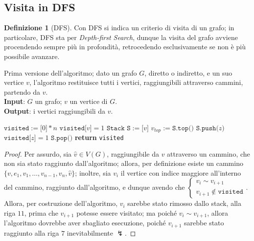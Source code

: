 \documentclass[14pt]{extreport}
\theoremstyle{definition}
\newtheorem{definition}{Definizione}[subsection]
\theoremstyle{definition}
\begin{document}
\subsection{Visita in DFS}

\begin{definition}[DFS]
    Con DFS si indica un criterio di visita di un grafo; in particolare, DFS sta per \textit{Depth-first Search}, dunque la visita del grafo avviene procendendo sempre più in profondità, retrocedendo esclusivamente se non è più possibile avanzare.
\end{definition}

\begin{algorithm}[H]
    \caption{
        Prima versione dell'algoritmo; dato un grafo $G$, diretto o indiretto, e un suo vertice $v$, l'algoritmo restituisce tutti i vertici, raggiungibili attraverso cammini, partendo da $v$.\\
        \textbf{Input}: $G$ un grafo; $v$ un vertice di $G$.\\
        \textbf{Output}: i vertici raggiungibili da $v$.
    }

    \begin{algorithmic}[1]
            \State $\texttt{visited}:=\texttt{[}0\texttt{]} * n$ 
            \State $\texttt{visited[}v\texttt{]} = 1$
            \State $\texttt{Stack S}:=\texttt{[}v\texttt{]}$
                \State $v_{top}:=\texttt{S.top()}$
                    \State $\texttt{S.push(}z\texttt{)}$
                    \State $\texttt{visited[}z\texttt{]} = 1$
                \Else
                    \State $\texttt{S.pop()}$
                \EndIf
            \EndWhile
            \State \textbf{return} \texttt{visited}
        \EndFunction
    \end{algorithmic}
\end{algorithm}

\begin{proof}
    Per assurdo, sia $\hat v \in V(G)$, raggiungibile da $v$ attraverso un cammino, che non sia stato raggiunto dall'algoritmo; allora, per definizione esiste un cammino $\{v, e_1, v_1, \ldots, v_{n - 1}, v_n, \hat v\}$; inoltre, sia $v_i$ il vertice con indice maggiore all'interno del cammino, raggiunto dall'algoritmo, e dunque avendo che $\left \{ \begin{array}{l}v_i \sim v_{i + 1} \\ v_{i + 1} \notin \texttt{visited}  \end{array} \right.$. Allora, per costruzione dell'algoritmo, $v_i$ sarebbe stato rimosso dallo stack, alla riga $11$, prima che $v_{i + 1}$ potesse essere visitato; ma poiché $v_i \sim v_{i +1}$, allora l'algoritmo dovrebbe aver sbagliato esecuzione, poiché $v_{i +1}$ sarebbe stato raggiunto alla riga $7$ inevitabilmente $\lightning$.
\end{proof}
\end{document}
